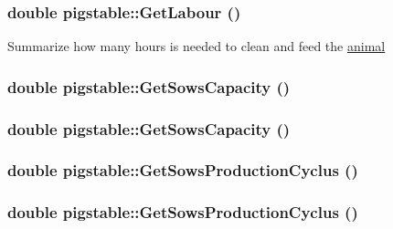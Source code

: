 \label{classpigstable_ac14a3ded55664bd4c44841044e787d15}
\hypertarget{classpigstable_ac14a3ded55664bd4c44841044e787d15}{
\subsubsection[{GetLabour}]{\setlength{\rightskip}{0pt plus 5cm}double pigstable::GetLabour ()}}
\label{classpigstable_ac14a3ded55664bd4c44841044e787d15}
Summarize how many hours is needed to clean and feed the \hyperlink{classanimal}{animal} \hypertarget{classpigstable_aabcb52218fd513e64a754db978910ac5}{
\subsubsection[{GetSowsCapacity}]{\setlength{\rightskip}{0pt plus 5cm}double pigstable::GetSowsCapacity ()}}
\label{classpigstable_aabcb52218fd513e64a754db978910ac5}
\hypertarget{classpigstable_aabcb52218fd513e64a754db978910ac5}{
\subsubsection[{GetSowsCapacity}]{\setlength{\rightskip}{0pt plus 5cm}double pigstable::GetSowsCapacity ()}}
\label{classpigstable_aabcb52218fd513e64a754db978910ac5}
\hypertarget{classpigstable_a66c14d2be32d4dba34a32ece913a3073}{
\subsubsection[{GetSowsProductionCyclus}]{\setlength{\rightskip}{0pt plus 5cm}double pigstable::GetSowsProductionCyclus ()}}
\label{classpigstable_a66c14d2be32d4dba34a32ece913a3073}
\hypertarget{classpigstable_a66c14d2be32d4dba34a32ece913a3073}{
\subsubsection[{GetSowsProductionCyclus}]{\setlength{\rightskip}{0pt plus 5cm}double pigstable::GetSowsProductionCyclus ()}}
